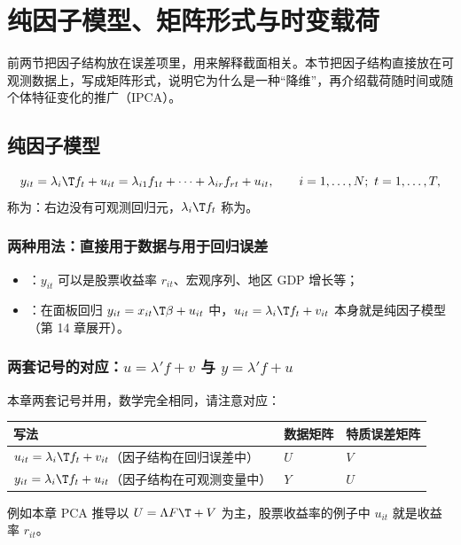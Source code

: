 \section{纯因子模型、矩阵形式与时变载荷}\label{sec:U13a-pure}

前两节把因子结构放在误差项里，用来解释截面相关。本节把因子结构直接放在可观测数据上，写成矩阵形式，说明它为什么是一种“降维”，再介绍载荷随时间或随个体特征变化的推广（IPCA）。

\subsection{纯因子模型}

\begin{defn}[纯因子模型]\label{def:U13a-pure}
\[
y_{it}=\lambda_i\T f_t+u_{it}=\lambda_{i1}f_{1t}+\dots+\lambda_{ir}f_{rt}+u_{it},\qquad i=1,\dots,N;\ t=1,\dots,T,
\]
称为：右边没有可观测回归元，$\lambda_i\T f_t$ 称为。
\end{defn}

\subsubsection{两种用法：直接用于数据与用于回归误差}

\begin{itemize}
\item {}：$y_{it}$ 可以是股票收益率 $r_{it}$、宏观序列、地区 GDP 增长等；
\item {}：在面板回归 $y_{it}=x_{it}\T\beta+u_{it}$ 中，$u_{it}=\lambda_i\T f_t+v_{it}$ 本身就是纯因子模型（第 14 章展开）。
\end{itemize}

\subsubsection{两套记号的对应：\texorpdfstring{$u=\lambda'f+v$}{u = lambda'f + v} 与 \texorpdfstring{$y=\lambda'f+u$}{y = lambda'f + u}}

本章两套记号并用，数学完全相同，请注意对应：
\begin{center}
\small
\begin{tabular}{lll}
\toprule
写法 & 数据矩阵 & 特质误差矩阵\\
\midrule
$u_{it}=\lambda_i\T f_t+v_{it}$（因子结构在回归误差中） & $U$ & $V$\\
$y_{it}=\lambda_i\T f_t+u_{it}$（因子结构在可观测变量中） & $Y$ & $U$\\
\bottomrule
\end{tabular}
\end{center}
例如本章 PCA 推导以 $U=\Lambda F\T+V$ 为主，股票收益率的例子中 $u_{it}$ 就是收益率 $r_{it}$。

